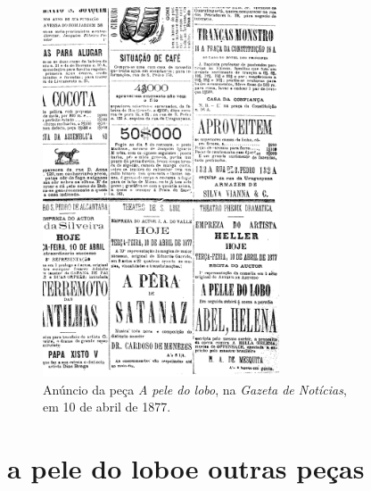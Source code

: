 
\begin{figure}
\begin{center}
\thispagestyle{empty}
\includegraphics[width=7cm]{01.png}\\
{\footnotesize
Anúncio da peça \textit{A pele do lobo}, na \textit{Gazeta de Notícias},\\ em
10 de abril de 1877.}
\end{center}
\end{figure}

\part[a pele do lobo e outras peças]{a pele do lobo\break e outras peças}





%
